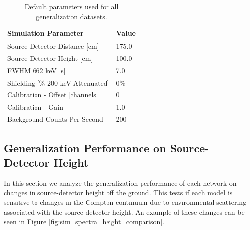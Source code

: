 \begin{table}[H]
\centering
\caption{Default parameters used for all generalization datasets.}
\label{table:default_sim_params}
\begin{tabular}{ll}
\hline
\textbf{Simulation Parameter} &  \textbf{Value} \\ \hline
Source-Detector Distance [cm] & 175.0\\ 
Source-Detector Height [cm] & 100.0\\ 
FWHM 662 keV [s] & 7.0\\ 
Shielding [\% 200 keV Attenuated] & 0\% \\ 
Calibration - Offset [channels] & 0 \\ 
Calibration - Gain & 1.0 \\ 
Background Counts Per Second & 200 \\ \hline 
\end{tabular}
\end{table}







\subsection{Generalization Performance on Source-Detector Height}

In this section we analyze the generalization performance of each network on changes in source-detector height off the ground. This tests if each model is sensitive to changes in the Compton continuum due to environmental scattering associated with the source-detector height. An example of these changes can be seen in Figure \ref{fig:sim_spectra_height_comparison}.


